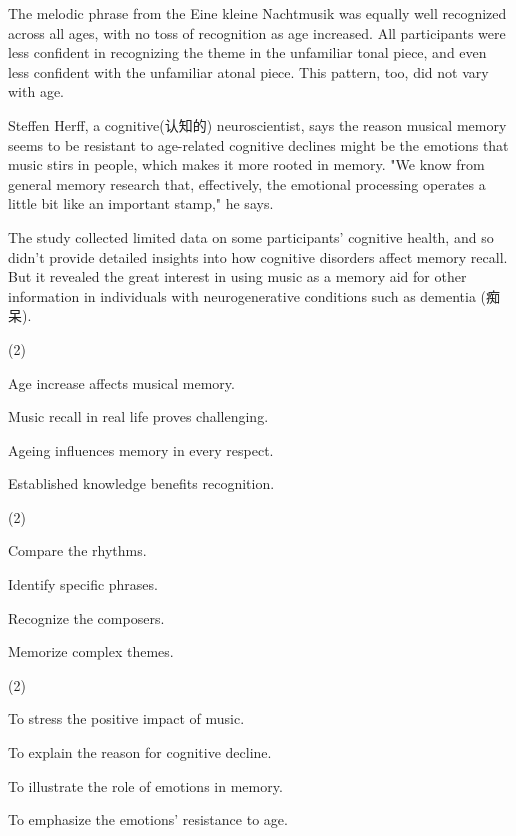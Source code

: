 \documentclass{英语试卷}
\begin{document}
\par The melodic phrase from the Eine kleine Nachtmusik was equally well recognized across all ages, with no toss of recognition as age increased. All participants were less confident in recognizing the theme in the unfamiliar tonal piece, and even less confident with the unfamiliar atonal piece. This pattern, too, did not vary with age.\par
\par Steffen Herff, a cognitive(认知的) neuroscientist, says the reason musical memory seems to be resistant to age-related cognitive declines might be the emotions that music stirs in people, which makes it more rooted in memory. "We know from general memory research that, effectively, the emotional processing operates a little bit like an important stamp," he says.\par
\par The study collected limited data on some participants' cognitive health, and so didn't provide detailed insights into how cognitive disorders affect memory recall. But it revealed the great interest in using music as a memory aid for other information in individuals with neurogenerative conditions such as dementia (痴呆).\par
{}
\begin{choices}(2)
  \item Age increase affects musical memory.
  \item Music recall in real life proves challenging.
  \item Ageing influences memory in every respect.
  \item Established knowledge benefits recognition.
\end{choices}
\begin{choices}(2)
  \item Compare the rhythms.
  \item Identify specific phrases.
  \item Recognize the composers.
  \item Memorize complex themes.
\end{choices}
\begin{choices}(2)
  \item To stress the positive impact of music.
  \item To explain the reason for cognitive decline.
  \item To illustrate the role of emotions in memory.
  \item To emphasize the emotions' resistance to age.
\end{choices}
\end{document}
